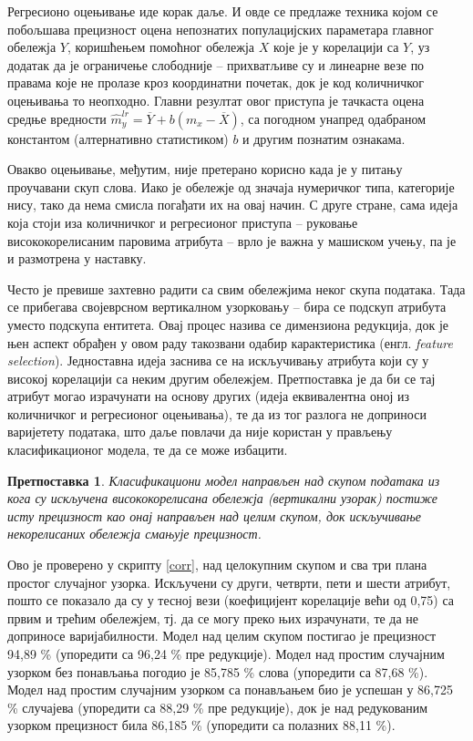 \documentclass[a4paper]{article}
\newtheorem{hipoteza}{Претпоставка}
\begin{document}
Регресионо оцењивање иде корак даље. И овде се предлаже техника којом се побољшава прецизност оцена непознатих популацијских параметара главног обележја $Y$, коришћењем помоћног обележја $X$ које је у корелацији са $Y$, уз додатак да је ограничење слободније -- прихватљиве су и линеарне везе по правама које не пролазе кроз координатни почетак, док је код количничког оцењивања то неопходно.\cite{prez6} Главни резултат овог приступа је тачкаста оцена средње вредности $\hat{m}^{lr}_y = \overline{Y} + b (m_x - \overline{X})$, са погодном унапред одабраном константом (алтернативно статистиком) $b$ и другим познатим ознакама.

Овакво оцењивање, међутим, није претерано корисно када је у питању проучавани скуп слова. Иако је обележје од значаја нумеричког типа, категорије нису, тако да нема смисла погађати их на овај начин. С друге стране, сама идеја која стоји иза количничког и регресионог приступа -- руковање висококорелисаним паровима атрибута -- врло је важна у машиском учењу, па је и размотрена у наставку.

Често је превише захтевно радити са свим обележјима неког скупа података. Тада се прибегава својеврсном вертикалном узорковању -- бира се подскуп атрибута уместо подскупа ентитета. Овај процес назива се димензиона редукција,\cite{mitic} док је њен аспект обрађен у овом раду такозвани одабир карактеристика (енгл. \textit{feature selection}). Једноставна идеја заснива се на искључивању атрибута који су у високој корелацији са неким другим обележјем. Претпоставка је да би се тај атрибут могао израчунати на основу других (идеја еквивалентна оној из количничког и регресионог оцењивања), те да из тог разлога не доприноси варијетету података, што даље повлачи да није користан у прављењу класификационог модела, те да се може избацити.

\begin{hipoteza}
Класификациони модел направљен над скупом података из кога су искључена висококорелисана обележја (вертикални узорак) постиже исту прецизност као онај направљен над целим скупом, док искључивање некорелисаних обележја смањује прецизност.
\end{hipoteza}

Ово је проверено у скрипту \ref{corr}, над целокупним скупом и сва три плана простог случајног узорка. Искључени су други, четврти, пети и шести атрибут, пошто се показало да су у тесној вези (коефицијент корелације већи од 0,75) са првим и трећим обележјем, тј. да се могу преко њих израчунати, те да не доприносе варијабилности. Модел над целим скупом постигао је прецизност 94,89 \% (упоредити са 96,24 \% пре редукције). Модел над простим случајним узорком без понављања погодио је 85,785 \% слова (упоредити са 87,68 \%). Модел над простим случајним узорком са понављањем био је успешан у 86,725 \% случајева (упоредити са 88,29 \% пре редукције), док је над редукованим узорком прецизност била 86,185 \% (упоредити са полазних 88,11 \%).
\end{document}
